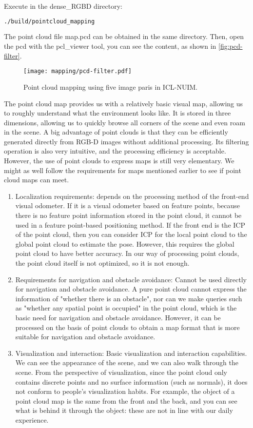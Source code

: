 Execute in the dense\_RGBD directory:
\begin{lstlisting}[language=sh, caption=Terminal input:]
	./build/pointcloud_mapping
\end{lstlisting}
The point cloud file map.pcd can be obtained in the same directory. Then, open the pcd with the pcl\_viewer tool, you can see the content, as shown in \autoref{fig:pcd-filter}.

\begin{figure}[!ht]
	\centering
	\texttt{[image: mapping/pcd-filter.pdf]}
	\caption{Point cloud mapping using five image paris in ICL-NUIM.}
	\label{fig:pcd-filter}
\end{figure}

The point cloud map provides us with a relatively basic visual map, allowing us to roughly understand what the environment looks like. It is stored in three dimensions, allowing us to quickly browse all corners of the scene and even roam in the scene. A big advantage of point clouds is that they can be efficiently generated directly from RGB-D images without additional processing. Its filtering operation is also very intuitive, and the processing efficiency is acceptable. However, the use of point clouds to express maps is still very elementary. We might as well follow the requirements for maps mentioned earlier to see if point cloud maps can meet.

\begin{enumerate}
	\item Localization requirements: depends on the processing method of the front-end visual odometer. If it is a visual odometer based on feature points, because there is no feature point information stored in the point cloud, it cannot be used in a feature point-based positioning method. If the front end is the ICP of the point cloud, then you can consider ICP for the local point cloud to the global point cloud to estimate the pose. However, this requires the global point cloud to have better accuracy. In our way of processing point clouds, the point cloud itself is not optimized, so it is not enough.
	\item Requirements for navigation and obstacle avoidance: Cannot be used directly for navigation and obstacle avoidance. A pure point cloud cannot express the information of "whether there is an obstacle", nor can we make queries such as "whether any spatial point is occupied" in the point cloud, which is the basic need for navigation and obstacle avoidance. However, it can be processed on the basis of point clouds to obtain a map format that is more suitable for navigation and obstacle avoidance.
	\item Visualization and interaction: Basic visualization and interaction capabilities. We can see the appearance of the scene, and we can also walk through the scene. From the perspective of visualization, since the point cloud only contains discrete points and no surface information (such as normals), it does not conform to people's visualization habits. For example, the object of a point cloud map is the same from the front and the back, and you can see what is behind it through the object: these are not in line with our daily experience.
\end{enumerate}

